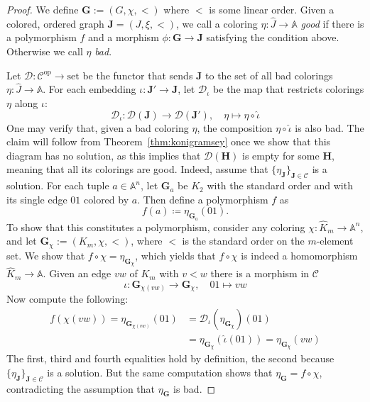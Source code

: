 \documentclass[oneside]{amsart}
\newcommand{\str}[1]{\mathbb{#1}}
\newcommand{\cat}[1]{\mathcal{#1}}
\newcommand{\op}{^{\mathrm{op}}}
\newcommand{\set}{\mathrm{set}}
\begin{document}
\begin{proof}
We define $\mathbf{G}:=(G,\chi,<)$ where $<$ is some linear order. Given a colored, ordered graph $\mathbf J = (J,\xi,<)$, we call a coloring $\eta\colon \hat J\to \str A$ \emph{good} if there is a polymorphism $f$ and a morphism $\phi\colon \mathbf{G}\to\mathbf{J}$ satisfying the condition above. Otherwise we call $\eta$ \emph{bad}.
    
    Let $\cat D\colon\cat C\op\to\set$ be the functor that sends $\mathbf{J}$ to the set of all bad colorings $\eta \colon\hat J\to \str A$.
    For each embedding $\iota\colon \mathbf{J'}\to\mathbf{J}$, let $\cat D_\iota$ be the map that restricts colorings $\eta$ along $\iota$:
    $$
    \cat D_\iota\colon \cat D(\mathbf{J})\to\cat D(\mathbf{J'}),\quad
    \eta\mapsto \eta\circ\hat\iota
    $$
    One may verify that, given a bad coloring $\eta$, the composition $\eta\circ\hat\iota$ is also bad.
    The claim will follow from Theorem~\ref{thm:konigramsey} once we show that this diagram has no solution, as this implies that $\cat D(\mathbf{H})$ is empty for some $\mathbf{H}$, meaning that all its colorings are good.
    Indeed, assume that $\{\eta_\mathbf{J}\}_{\mathbf{J}\in\cat C}$ is a solution. 
    For each tuple $a\in\str A^n$, let $\mathbf G_a$ be $K_2$ with the standard order and with its single edge $01$ colored by $a$. Then define a polymorphism $f$ as
    $$
    f(a)\coloneq \eta_{\mathbf{G}_a}(01).
    $$
    To show that this constitutes a polymorphism, consider any coloring $\chi\colon\hat K_m\to\str A^n$, and let $\mathbf{G}_\chi:= (K_m, \chi, <)$, where $<$ is the standard order on the $m$-element set.
    We show that  $f\circ \chi = \eta_{\mathbf{G}_\chi}$, which yields that $f\circ \chi$ is indeed a homomorphism $\hat K_m\to \str A$.
    Given an edge $vw$ of $K_m$ with
    $v < w$ there is a morphism in $\cat C$
    $$
    \iota\colon
    \mathbf{G}_{\chi(vw)}\to\mathbf{G}_\chi,\quad
    01\mapsto vw 
    $$
    Now compute the following:
    \begin{align*}
        f(\chi(vw))  = \eta_{\mathbf{G}_{\chi(vw)}} (01) 
        &= \cat D_\iota ( \eta_{\mathbf{G}_\chi})(01) \\&= \eta_{\mathbf{G}_\chi}(\hat\iota(01)) = 
        \eta_{\mathbf{G}_\chi}(vw)
    \end{align*}
    The first, third and fourth equalities hold by definition, the second because $\{\eta_\mathbf{J}\}_{\mathbf{J}\in\cat C}$ is a solution. But the same computation shows that $\eta_{\mathbf{G}}=f\circ\chi$, contradicting the assumption that $\eta_{\mathbf{G}}$ is bad.
\end{proof}
\end{document}
